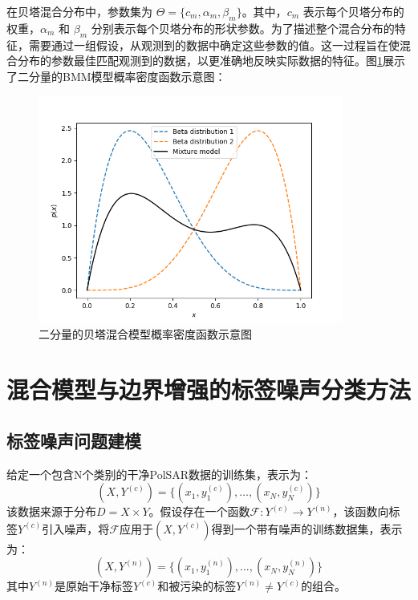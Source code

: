 在贝塔混合分布中，参数集为 $\Theta = \{c_m, \alpha_m, \beta_m\}$。其中，$c_m$ 表示每个贝塔分布的权重，$\alpha_m$ 和 $\beta_m$ 分别表示每个贝塔分布的形状参数。为了描述整个混合分布的特征，需要通过一组假设，从观测到的数据中确定这些参数的值。这一过程旨在使混合分布的参数最佳匹配观测到的数据，以更准确地反映实际数据的特征。图\ref{BMM}展示了二分量的BMM模型概率密度函数示意图：
\begin{figure}[ht!]
  \centering
  \includegraphics[width=10cm]{pic/chapter4/BMM.png}
  \caption{二分量的贝塔混合模型概率密度函数示意图}
  \label{BMM}
\end{figure}

\section{混合模型与边界增强的标签噪声分类方法}
\subsection{标签噪声问题建模}
给定一个包含N个类别的干净PolSAR数据的训练集，表示为：
\begin{equation}
  (X, Y^{(c)})=\{(x_1,y_1^{(c)}),\ldots,(x_N,y_N^{(c)})\}
\end{equation}
该数据来源于分布$D=X \times Y$。假设存在一个函数$\mathcal{F}:Y^{(c)} \rightarrow Y^{(n)}$，该函数向标签$Y^{(c)}$引入噪声，将$\mathcal{F}$应用于$(X, Y^{(c)})$得到一个带有噪声的训练数据集，表示为：
\begin{equation}
  (X, Y^{(n)})=\{(x_1,y_1^{(n)}),\ldots,(x_N,y_N^{(n)})\}
\end{equation}
其中$Y^{(n)}$是原始干净标签$Y^{(c)}$和被污染的标签$Y^{(n)} \neq Y^{(c)}$的组合。

